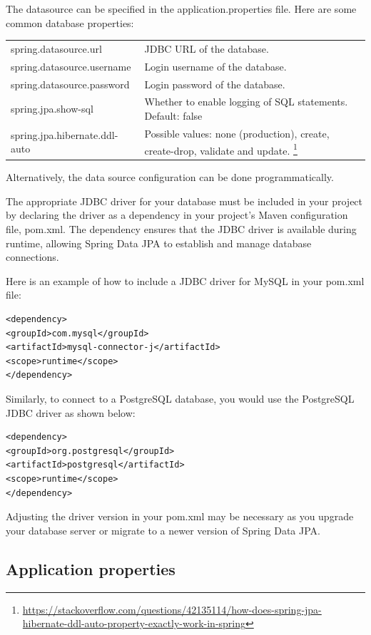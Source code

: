 The datasource can be specified in the application.properties file.
Here are some common database properties:

\begin{tabular}{|l|p{8cm}|}
\hline
spring.datasource.url & JDBC URL of the database.\\
spring.datasource.username & Login username of the database.\\
spring.datasource.password & Login password of the database.\\
spring.jpa.show-sql & Whether to enable logging of SQL statements. Default: false\\
spring.jpa.hibernate.ddl-auto & Possible values: none (production), create, create-drop, validate and update. \footnote{\url{https://stackoverflow.com/questions/42135114/how-does-spring-jpa-hibernate-ddl-auto-property-exactly-work-in-spring}}\\
\hline
\end{tabular}

Alternatively, the data source configuration can be done programmatically.

The appropriate JDBC driver for your database must be included in your project by declaring the driver as a dependency in your project's Maven configuration file, pom.xml. The dependency ensures that the JDBC driver is available during runtime, allowing Spring Data JPA to establish and manage database connections.

Here is an example of how to include a JDBC driver for MySQL in your pom.xml file:

\begin{lstlisting}
<dependency>
<groupId>com.mysql</groupId>
<artifactId>mysql-connector-j</artifactId>
<scope>runtime</scope>
</dependency>
\end{lstlisting}


Similarly,  to connect to a PostgreSQL database, you would use the PostgreSQL JDBC driver as shown below:

\begin{lstlisting}
<dependency>
<groupId>org.postgresql</groupId>
<artifactId>postgresql</artifactId>
<scope>runtime</scope>
</dependency>
\end{lstlisting}

Adjusting the driver version in your pom.xml may be necessary as you upgrade your database server or migrate to a newer version of Spring Data JPA.

\subsection{Application properties}


